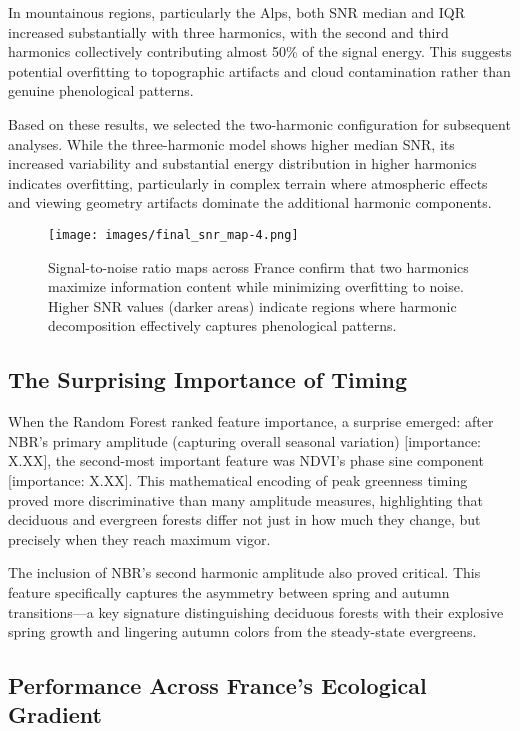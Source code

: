 \documentclass[utf8]{FrontiersinHarvard}
\begin{document}
In mountainous regions, particularly the Alps, both SNR median and IQR increased substantially with three harmonics, with the second and third harmonics collectively contributing almost 50\% of the signal energy. This suggests potential overfitting to topographic artifacts and cloud contamination rather than genuine phenological patterns.

Based on these results, we selected the two-harmonic configuration for subsequent analyses. While the three-harmonic model shows higher median SNR, its increased variability and substantial energy distribution in higher harmonics indicates overfitting, particularly in complex terrain where atmospheric effects and viewing geometry artifacts dominate the additional harmonic components.

\begin{figure}[H]
    \centering
    \texttt{[image: images/final\_snr\_map-4.png]}
    \caption{Signal-to-noise ratio maps across France confirm that two harmonics maximize information content while minimizing overfitting to noise. Higher SNR values (darker areas) indicate regions where harmonic decomposition effectively captures phenological patterns.}
    \label{fig:snr_maps}
\end{figure}

\subsection{The Surprising Importance of Timing}

When the Random Forest ranked feature importance, a surprise emerged: after NBR's primary amplitude (capturing overall seasonal variation) [importance: X.XX], the second-most important feature was NDVI's phase sine component [importance: X.XX]. This mathematical encoding of peak greenness timing proved more discriminative than many amplitude measures, highlighting that deciduous and evergreen forests differ not just in how much they change, but precisely when they reach maximum vigor.

The inclusion of NBR's second harmonic amplitude also proved critical. This feature specifically captures the asymmetry between spring and autumn transitions—a key signature distinguishing deciduous forests with their explosive spring growth and lingering autumn colors from the steady-state evergreens.

\subsection{Performance Across France's Ecological Gradient}
\end{document}
